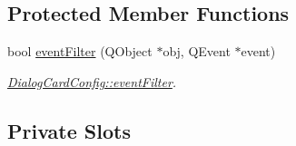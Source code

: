 \subsection*{Protected Member Functions}
\begin{DoxyCompactItemize}
\item 
bool \mbox{\hyperlink{class_dialog_card_config_a8d0540f792fe8b7a434e010a5c22a0df}{event\+Filter}} (Q\+Object $\ast$obj, Q\+Event $\ast$event)
\begin{DoxyCompactList}\small\item\em \mbox{\hyperlink{class_dialog_card_config_a8d0540f792fe8b7a434e010a5c22a0df}{Dialog\+Card\+Config\+::event\+Filter}}. \end{DoxyCompactList}\end{DoxyCompactItemize}
\subsection*{Private Slots}
